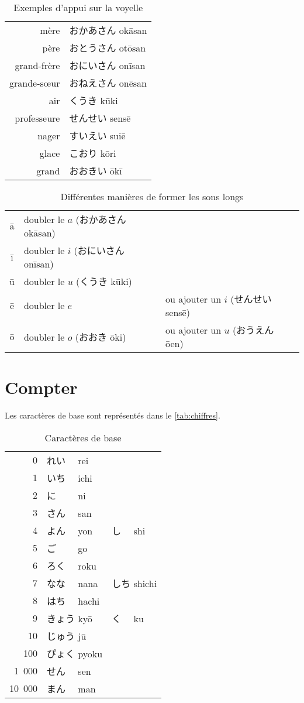 \documentclass[a4paper,10pt,french,openany]{memoir}
\begin{document}
\begin{table}[htbp]
 \centering
 \begin{tabular}{rl}
  mère & おかあさん okāsan \\
  père & おとうさん otōsan\\
  grand-frère & おにいさん onīsan\\
  grande-sœur & おねえさん onēsan\\
  air & くうき kūki\\
  professeur\cdot{}e & せんせい sensē\\
  nager & すいえい suiē\\
  glace & こおり kōri\\
  grand & おおきい ōkī\\
 \end{tabular}
 \caption{Exemples d'appui sur la voyelle}
 \label{tab:ex-doublage}
\end{table}

\begin{table}[htbp]
 \centering
 \begin{tabular}{cll}
  ā & doubler le $a$ (おかあさん okāsan)\\
  ī & doubler le $i$ (おにいさん onīsan)\\
  ū & doubler le $u$ (くうき kūki)\\
  ē & doubler le $e$ & ou ajouter un $i$ (せんせい sensē)\\
  ō & doubler le $o$ (おおき ōki) & ou ajouter un $u$ (おうえん ōen)\\
 \end{tabular}
 \caption{Différentes manières de former les sons longs}
 \label{tab:long-sounds}
\end{table}

\chapter{Compter}

Les caractères de base sont représentés dans le \autoref{tab:chiffres}.

\begin{table}[htbp]
 \centering
 \begin{tabular}{rll}
  0 & れい　 rei\\
  1 & いち　 ichi\\
  2 & に　　 ni\\
  3 & さん　 san\\
  4 & よん　 yon & し　 shi\\
  5 & ご　　 go\\
  6 & ろく　 roku\\
  7 & なな　 nana & しち shichi\\
  8 & はち　 hachi\\
  9 & きょう kyō & く　 ku\\
 10 & じゅう jū\\
 100 & ぴょく pyoku\\
 1~000 & せん　 sen\\
 10~000 & まん　 man\\
 \end{tabular}
 \caption{Caractères de base}
 \label{tab:chiffres}
\end{table}
\end{document}
